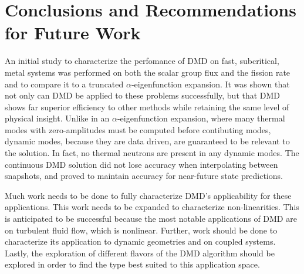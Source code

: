 \documentclass[12pt]{article}
\begin{document}
\section{Conclusions and Recommendations for Future Work}
An initial study to characterize the perfomance of DMD on fast, subcritical, 
	metal systems was performed on both the scalar group flux and the fission 
	rate and to compare it to a truncated $\alpha$-eigenfunction expansion.
It was shown that not only can DMD be applied to these problems successfully,
	but that DMD shows far superior efficiency to other methods while retaining 
	the same level of physical insight.
Unlike in an $\alpha$-eigenfunction expansion, where many thermal modes with 
	zero-amplitudes must be computed before contibuting modes, dynamic modes, 
	because they are data driven, are guaranteed to be relevant to the solution.
In fact, no thermal neutrons are present in any dynamic modes.
The continuous DMD solution did not lose accuracy when interpolating between 
	snapshots, and proved to maintain accuracy for near-future state predictions.

Much work needs to be done to fully characterize DMD's applicability for these
	applications.
This work needs to be expanded to characterize non-linearities.
This is anticipated to be successful because the most notable applications of
	DMD are on turbulent fluid flow, which is nonlinear.
Further, work should be done to characterize its application to dynamic
	geometries and on coupled systems.
Lastly, the exploration of different flavors of the DMD algorithm should be 
	explored in order to find the type best suited to this application space.

\setlength{\baselineskip}{12pt}


\end{document}
